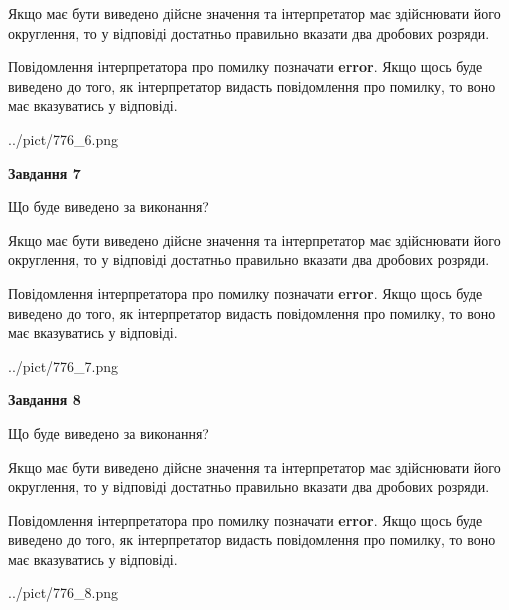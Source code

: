 \documentclass[12pt, ukrainian]{article}
\begin{document}
{\begin {Large}
Якщо має бути виведено дійсне значення та інтерпретатор має здійснювати його округлення, 
то у відповіді достатньо правильно вказати два дробових розряди.

Повідомлення інтерпретатора про помилку позначати \textbf{error}.
Якщо щось буде виведено до того, як інтерпретатор видасть повідомлення про помилку, 
то воно має вказуватись у відповіді. \par

\begin{center}
	{../pict/776_6.png}
\end{center}
\newpage

{\begin {center}\textbf{Завдання 7}\end {center}}\par
Що буде виведено за виконання? \par

Якщо має бути виведено дійсне значення та інтерпретатор має здійснювати його округлення, 
то у відповіді достатньо правильно вказати два дробових розряди.

Повідомлення інтерпретатора про помилку позначати \textbf{error}.
Якщо щось буде виведено до того, як інтерпретатор видасть повідомлення про помилку, 
то воно має вказуватись у відповіді. \par

\begin{center}
	{../pict/776_7.png}
\end{center}
\newpage

{\begin {center}\textbf{Завдання 8}\end {center}}\par
Що буде виведено за виконання? \par

Якщо має бути виведено дійсне значення та інтерпретатор має здійснювати його округлення, 
то у відповіді достатньо правильно вказати два дробових розряди.

Повідомлення інтерпретатора про помилку позначати \textbf{error}.
Якщо щось буде виведено до того, як інтерпретатор видасть повідомлення про помилку, 
то воно має вказуватись у відповіді. \par

\begin{center}
	{../pict/776_8.png}
\end{center}
\newpage


\end{Large}}
\end{document}
